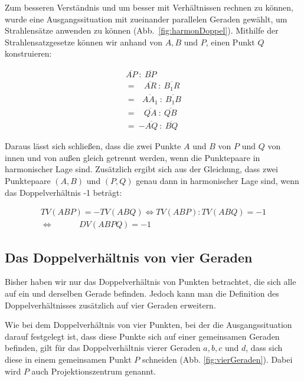\documentclass[12pt,a4paper]{article}
\begin{document}
Zum besseren Verständnis und um besser mit Verhältnissen rechnen zu können, wurde eine Ausgangssituation mit zueinander parallelen Geraden gewählt, um Strahlensätze anwenden zu können (Abb.~\ref{fig:harmonDoppel}). Mithilfe der Strahlensatzgesetze können wir anhand von $A, B$ und $P$, einen Punkt $Q$ konstruieren:

\begin{equation*}
\begin{split}
  \overline{A P}~:~\overline{B P}~\\
=~~~~ \overline{A R}~:~\overline{B_1 R}\\
=~~~ \overline{A A_1}~:~\overline{B_1 B}\\
=~~~~ \overline{Q A}~:~\overline{Q B}~\\
=~ {-\overline{A Q}}~:~\overline{B Q}~
\end{split}
\end{equation*}

Daraus lässt sich schließen, dass die zwei Punkte $A$ und $B$ von $P$ und $Q$ von innen und von außen gleich getrennt werden, wenn die Punktepaare in harmonischer Lage sind. Zusätzlich ergibt sich aus der Gleichung, dass zwei Punktepaare $(A, B)$ und $(P, Q)$ genau dann in harmonischer Lage sind, wenn das Doppelverhältnis -1 beträgt:

\begin{equation*}
\begin{split}
TV(A B P) = -TV(A B Q) \Longleftrightarrow TV(A B P) : TV(A B Q) = -1 \\ \Longleftrightarrow ~~~~~~~~~~~~~~DV(A B P Q) = -1
\end{split}
\end{equation*}

\subsection{Das Doppelverhältnis von vier Geraden}

Bisher haben wir nur das Doppelverhältnis von Punkten betrachtet, die sich alle auf ein und derselben Gerade befinden. Jedoch kann man die Definition des Doppelverhältnisses zusätzlich auf vier Geraden erweitern.

Wie bei dem Doppelverhältnis von vier Punkten, bei der die Ausgangssituation darauf festgelegt ist, dass diese Punkte sich auf einer gemeinsamen Geraden befinden, gilt für das Doppelverhältnis vierer Geraden $a, b, c$ und $d$, dass sich diese in einem gemeinsamen Punkt $P$ schneiden (Abb. \ref{fig:vierGeraden}). Dabei wird $P$ auch Projektionszentrum genannt.
\end{document}
